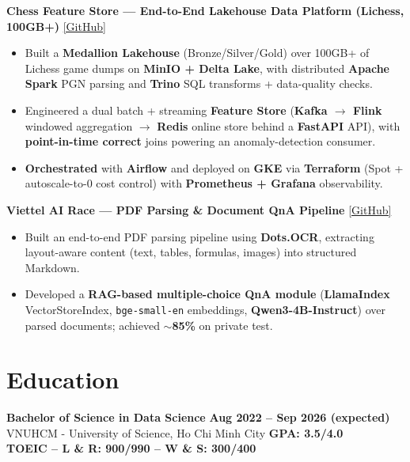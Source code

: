 \documentclass[a4paper,10pt]{article}
\begin{document}
\vspace{0.2em}
\noindent\textbf{Chess Feature Store --- End-to-End Lakehouse Data Platform (Lichess, 100GB+)} \hfill \href{https://github.com/theAbyssOfTime2004/lichess-feature-store}{\color{darkblue}[GitHub]} \\\vspace{-1.1em}

\begin{itemize}[leftmargin=1.2em, itemsep=0.05em, parsep=0pt]
    \item Built a \textbf{Medallion Lakehouse} (Bronze/Silver/Gold) over 100GB+ of Lichess game dumps on \textbf{MinIO + Delta Lake}, with distributed \textbf{Apache Spark} PGN parsing and \textbf{Trino} SQL transforms + data-quality checks.
    \item Engineered a dual batch + streaming \textbf{Feature Store} (\textbf{Kafka $\rightarrow$ Flink} windowed aggregation $\rightarrow$ \textbf{Redis} online store behind a \textbf{FastAPI} API), with \textbf{point-in-time correct} joins powering an anomaly-detection consumer.
    \item \textbf{Orchestrated} with \textbf{Airflow} and deployed on \textbf{GKE} via \textbf{Terraform} (Spot + autoscale-to-0 cost control) with \textbf{Prometheus + Grafana} observability.
\end{itemize}

\vspace{0.2em}
\noindent\textbf{Viettel AI Race --- PDF Parsing \& Document QnA Pipeline} \hfill \href{https://github.com/theAbyssOfTime2004/Viettel-AI-Race}{\color{darkblue}[GitHub]} \\
\vspace{-1.1em}
\begin{itemize}[leftmargin=1.2em, itemsep=0.05em, parsep=0pt]
  \item Built an end-to-end PDF parsing pipeline using \textbf{Dots.OCR}, extracting layout-aware content (text, tables, formulas, images) into structured Markdown.
  \item Developed a \textbf{RAG-based multiple-choice QnA module} (\textbf{LlamaIndex} VectorStoreIndex, \texttt{bge-small-en} embeddings, \textbf{Qwen3-4B-Instruct}) over parsed documents; achieved $\sim$\textbf{85\%} on private test.
\end{itemize}

\section{Education}
\textbf{Bachelor of Science in Data Science} \hfill \textbf{Aug 2022 -- Sep 2026 (expected)} \\
VNUHCM - University of Science, Ho Chi Minh City \hfill \textbf{GPA: 3.5/4.0} \\
\textbf{TOEIC – L \& R: 900/990 – W \& S: 300/400}
\end{document}
